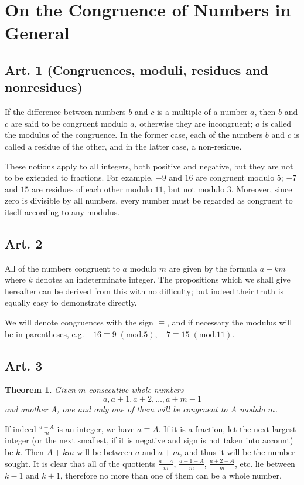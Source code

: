 \documentclass[10pt,psamsfonts,leqno,oneside,letterpaper]{amsart}
\theoremstyle{theorem}
\newtheorem{theorem}{Theorem}
\begin{document}
\author{Lucas Culler}

\section*{ On the Congruence of Numbers in General } 

\subsection*{Art. 1 (Congruences, moduli, residues and nonresidues)}  If the difference between numbers $b$ and $c$ is a multiple of a number $a$, then $b$ and $c$ are said to be congruent modulo $a$, otherwise they are incongruent; $a$ is called the modulus of the congruence.  In the former case, each of the numbers $b$ and $c$ is called a residue of the other, and in the latter case, a non-residue.

These notions apply to all integers, both positive and negative, but they are not to be extended to fractions.  For example, $-9$ and $16$ are congruent modulo $5$; $-7$ and $15$ are residues of each other modulo $11$, but not modulo $3$.  Moreover, since zero is divisible by all numbers, every number must be regarded as congruent to itself according to any modulus.

\subsection*{Art. 2} All of the numbers congruent to $a$ modulo $m$ are given by the formula $a+km$ where $k$ denotes an indeterminate integer.  The propositions which we shall give hereafter can be derived from this with no difficulty; but indeed their truth is equally easy to demonstrate directly.

We will denote congruences with the sign $\equiv$, and if necessary the modulus will be in parentheses, e.g. $-16 \equiv 9 \; (\mathrm{mod.} 5)$, $-7 \equiv 15  \;(\mathrm{mod.} 11)$. 

\subsection*{Art. 3} \begin{theorem} Given $m$ consecutive whole numbers
\[ a, a+1, a+2,\dots, a+m-1 \]
and another $A$, one and only one of them will be congruent to $A$ modulo $m$.
\end{theorem}
If indeed $\frac{a-A}{m}$ is an integer, we have $a \equiv A$.  If it is a fraction, let the next largest integer (or the next smallest, if it is negative and sign is not taken into account) be $k$.  Then $A + km$ will be between $a$ and $a+m$, and thus it will be the number sought.  It is clear that all of the quotients $\frac{a-A}{m}$, $\frac{a+1-A}{m}$, $\frac{a+2-A}{m}$, etc. lie between $k-1$ and $k+1$, therefore no more than one of them can be a whole number.
\end{document}
